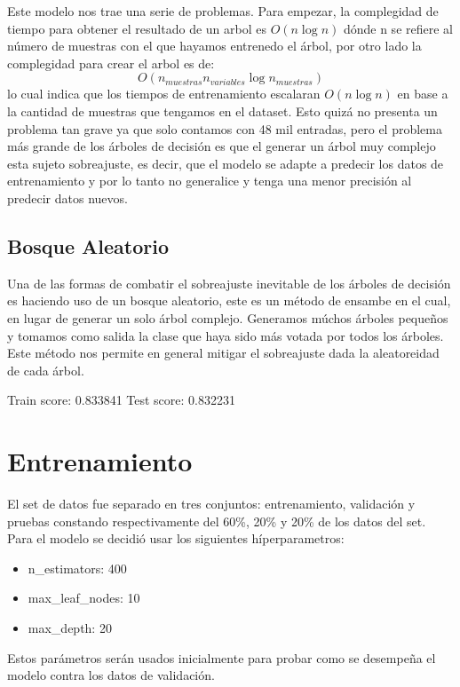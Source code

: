 \documentclass[twocolumn]{article}
\begin{document}
Este modelo nos trae una serie de problemas. Para empezar, la complegidad de tiempo
para obtener el resultado de un arbol es $O(n\log{n})$ dónde n se refiere al número
de muestras con el que hayamos entrenedo el árbol, por otro lado la complegidad para
crear el arbol es de:
\begin{equation}
  O(n_{muestras}n_{variables}\log{n_{muestras}})
\end{equation}
lo cual indica que los tiempos de entrenamiento escalaran $O(n\log{n})$ en base
a la cantidad de muestras que tengamos en el dataset. Esto quizá no presenta un problema
tan grave ya que solo contamos con 48 mil entradas, pero el problema más grande de 
los árboles de decisión es que el generar un árbol muy complejo esta sujeto sobreajuste,
es decir, que el modelo se adapte a predecir los datos de entrenamiento y por lo
tanto no generalice y tenga una menor precisión al predecir datos nuevos.

\subsection{Bosque Aleatorio}
Una de las formas de combatir el sobreajuste inevitable de los árboles de decisión
es haciendo uso de un bosque aleatorio, este es un método de ensambe en el cual,
en lugar de generar un solo árbol complejo. Generamos múchos árboles pequeños y
tomamos como salida la clase que haya sido más votada por todos los árboles.
Este método nos permite en general mitigar el sobreajuste dada la aleatoreidad de 
cada árbol.

Train score: 0.833841
Test score: 0.832231

\section{Entrenamiento}
El set de datos fue separado en tres conjuntos: entrenamiento, validación y pruebas
constando respectivamente del 60\%, 20\% y 20\% de los datos del set. Para el modelo
se decidió usar los siguientes híperparametros:
\begin{itemize}
  \item n\_estimators: 400
  \item max\_leaf\_nodes: 10
  \item max\_depth: 20
\end{itemize}
Estos parámetros serán usados inicialmente para probar como se desempeña el modelo 
contra los datos de validación.
\end{document}
